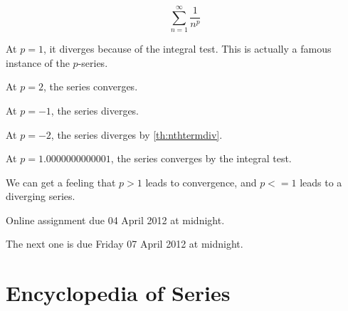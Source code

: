 \[ \sum_{n=1}^{\infty} \frac{1}{n^p} \]

At \(p=1\), it diverges because of the integral test.
This is actually a famous instance of the \(p\)-series.

At \(p=2\), the series converges.

At \(p=-1\), the series diverges.

At \(p=-2\), the series diverges by \ref{th:nthtermdiv}.

At \(p=1.0000000000001\), the series converges by the integral test.

We can get a feeling that \( p>1 \) leads to convergence, and \(p <= 1\) leads to a diverging series.

\begin{homework}
  Online assignment due 04 April 2012 at midnight.

  The next one is due Friday 07 April 2012 at midnight.
\end{homework}

\section{Encyclopedia of Series}

